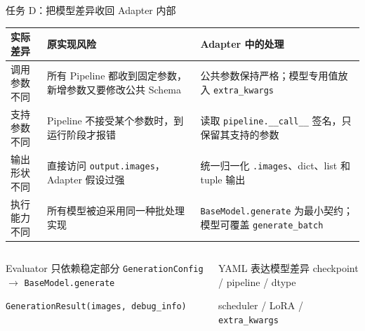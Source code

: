\documentclass[aspectratio=169,10pt]{beamer}
\begin{document}
\begin{frame}{任务 D：把模型差异收回 Adapter 内部}
  \begin{table}
    \centering\scriptsize
    \renewcommand{\arraystretch}{1.3}
    \begin{tabularx}{\textwidth}{p{2.1cm}X X}
      \toprule
      实际差异 & 原实现风险 & Adapter 中的处理 \\
      \midrule
      调用参数不同 & 所有 Pipeline 都收到固定参数，新增参数又要修改公共 Schema & 公共参数保持严格；模型专用值放入 \texttt{extra\_kwargs} \\
      支持参数不同 & Pipeline 不接受某个参数时，到运行阶段才报错 & 读取 \texttt{pipeline.\_\_call\_\_} 签名，只保留其支持的参数 \\
      输出形状不同 & 直接访问 \texttt{output.images}，Adapter 假设过强 & 统一归一化 \texttt{.images}、dict、list 和 tuple 输出 \\
      执行能力不同 & 所有模型被迫采用同一种批处理实现 & \texttt{BaseModel.generate} 为最小契约；模型可覆盖 \texttt{generate\_batch} \\
      \bottomrule
    \end{tabularx}
  \end{table}

  \vspace{0.55em}
  \begin{columns}[T,onlytextwidth]
      \begin{block}{Evaluator 只依赖稳定部分}
        \centering\small
        \texttt{GenerationConfig} $\rightarrow$ \texttt{BaseModel.generate}\par
        \vspace{0.35em}
        \texttt{GenerationResult(images, debug\_info)}
      \end{block}
      \begin{block}{YAML 表达模型差异}
        \centering\small
        checkpoint / pipeline / dtype\par
        \vspace{0.35em}
        scheduler / LoRA / \texttt{extra\_kwargs}
      \end{block}
  \end{columns}
\end{frame}
\end{document}
